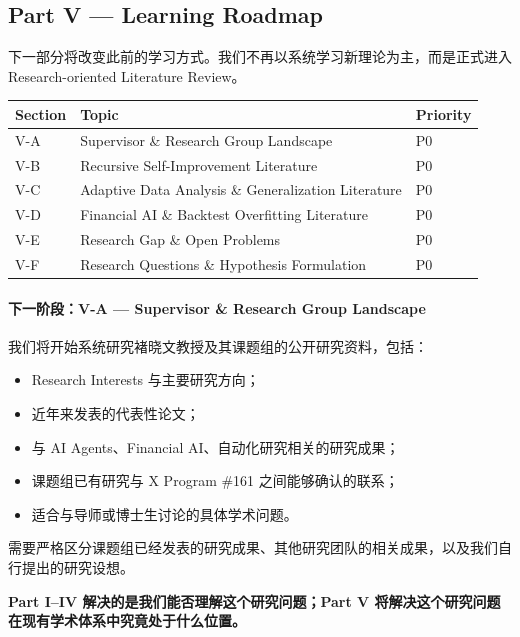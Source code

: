 \hypertarget{part-4-77-0001-part-v-learning-roadmap}{%
\subsection{Part V --- Learning Roadmap}\label{part-4-77-0001-part-v-learning-roadmap}}

下一部分将改变此前的学习方式。我们不再以系统学习新理论为主，而是正式进入 Research-oriented Literature Review。

\begin{readertable}
\begin{longtable}[]{@{}
  >{\raggedright\arraybackslash}p{}
  >{\raggedright\arraybackslash}p{}
  >{\raggedright\arraybackslash}p{}@{}}
\toprule
Section & Topic & Priority \\
\midrule
\endhead
V-A & Supervisor \& Research Group Landscape & P0 \\
V-B & Recursive Self-Improvement Literature & P0 \\
V-C & Adaptive Data Analysis \& Generalization Literature & P0 \\
V-D & Financial AI \& Backtest Overfitting Literature & P0 \\
V-E & Research Gap \& Open Problems & P0 \\
V-F & Research Questions \& Hypothesis Formulation & P0 \\
\bottomrule
\end{longtable}
\end{readertable}

\hypertarget{part-4-77-0001-ux4e0bux4e00ux9636ux6bb5v-a-supervisor-research-group-landscape}{%
\paragraph{下一阶段：V-A --- Supervisor \& Research Group Landscape}\label{part-4-77-0001-ux4e0bux4e00ux9636ux6bb5v-a-supervisor-research-group-landscape}}

我们将开始系统研究褚晓文教授及其课题组的公开研究资料，包括：

\begin{itemize}
\tightlist
\item
  Research Interests 与主要研究方向；
\item
  近年来发表的代表性论文；
\item
  与 AI Agents、Financial AI、自动化研究相关的研究成果；
\item
  课题组已有研究与 X Program \#161 之间能够确认的联系；
\item
  适合与导师或博士生讨论的具体学术问题。
\end{itemize}

需要严格区分课题组已经发表的研究成果、其他研究团队的相关成果，以及我们自行提出的研究设想。

\textbf{Part I--IV 解决的是我们能否理解这个研究问题；Part V 将解决这个研究问题在现有学术体系中究竟处于什么位置。}
